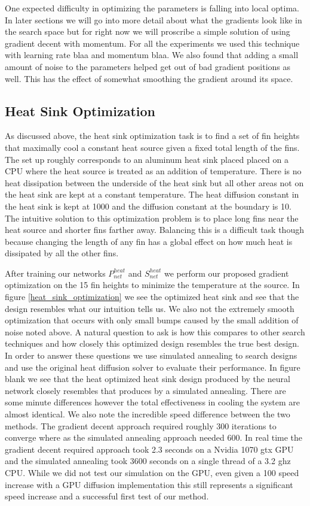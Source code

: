 \documentclass{article} %
\begin{document}
One expected difficulty in optimizing the parameters is falling into local optima. In later sections we will go into more detail about what the gradients look like in the search space but for right now we will proscribe a simple solution of using gradient decent with momentum. For all the experiments we used this technique with learning rate blaa and momentum blaa. We also found that adding a small amount of noise to the parameters helped get out of bad gradient positions as well. This has the effect of somewhat smoothing the gradient around its space.

\subsection{Heat Sink Optimization}

As discussed above, the heat sink optimization task is to find a set of fin heights that maximally cool a constant heat source given a fixed total length of the fins. The set up roughly corresponds to an aluminum heat sink placed placed on a CPU where the heat source is treated as an addition of temperature. There is no heat dissipation between the underside of the heat sink but all other areas not on the heat sink are kept at a constant temperature. The heat diffusion constant in the heat sink is kept at 1000 and the diffusion constant at the boundary is 10. The intuitive solution to this optimization problem is to place long fins near the heat source and shorter fins farther away. Balancing this is a difficult task though because changing the length of any fin has a global effect on how much heat is dissipated by all the other fins. 

After training our networks $P^{heat}_{net}$ and $S^{heat}_{net}$ we perform our proposed gradient optimization on the 15 fin heights to minimize the temperature at the source. In figure \ref{heat_sink_optimization} we see the optimized heat sink and see that the design resembles what our intuition tells us. We also not the extremely smooth optimization that occurs with only small bumps caused by the small addition of noise noted above. A natural question to ask is how this compares to other search techniques and how closely this optimized design resembles the true best design. In order to answer these questions we use simulated annealing to search designs and use the original heat diffusion solver to evaluate their performance. In figure blank we see that the heat optimized heat sink design produced by the neural network closely resembles that produces by a simulated annealing. There are some minute differences however the total effectiveness in cooling the system are almost identical. We also note the incredible speed difference between the two methods. The gradient decent approach required roughly 300 iterations to converge where as the simulated annealing approach needed 600. In real time the gradient decent required approach took 2.3 seconds on a Nvidia 1070 gtx GPU and the simulated annealing took 3600 seconds on a single thread of a 3.2 ghz CPU. While we did not test our simulation on the GPU, even given a 100 speed increase with a GPU diffusion implementation this still represents a significant speed increase and a successful first test of our method.
\end{document}
